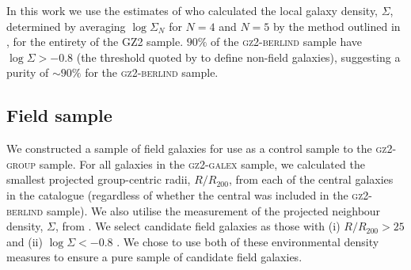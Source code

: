 \documentclass[useAMS,usenatbib]{mn2e}
\begin{document}
In this work we use the estimates of \cite{Bamford09} who calculated the local galaxy density, $\Sigma$, determined by averaging $\log\Sigma_N$ for $N = 4$ and $N=5$ by the method outlined in \citet{Baldry06}, for the entirety of the GZ2 sample. $90\%$ of the \textsc{gz2-berlind} sample have $\log\Sigma > -0.8$ (the threshold quoted by \citealt{Baldry06} to define non-field galaxies), suggesting a purity of $\sim90\%$ for the \textsc{gz2-berlind} sample.%



\subsection{Field sample}\label{sec:field}


We constructed a sample of field galaxies for use as a control sample to the \textsc{gz2-group} sample. For all galaxies in the \textsc{gz2-galex} sample, we calculated the smallest projected group-centric radii, $R/R_{200}$, from each of the central galaxies in the \citet{berlind06} catalogue (regardless of whether the central was included in the \textsc{gz2-berlind} sample). We also utilise the measurement of the projected neighbour density, $\Sigma$, from \cite{Baldry06}. We select candidate field galaxies as those with (i) $R/R_{200} > 25$ and (ii) $\log\Sigma < -0.8$ \citep[the threshold on the local environment density which selects field galaxies as defined by][]{Baldry06}. We chose to use both of these environmental density measures to ensure a pure sample of candidate field galaxies.
\end{document}
